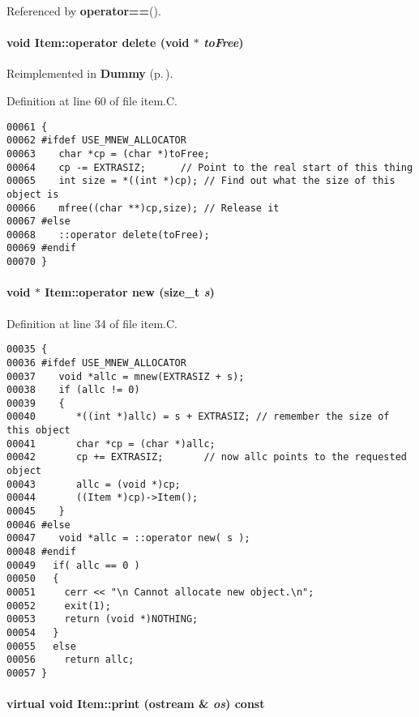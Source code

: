 Referenced by {\bf operator==}().\label{Item_a7}
\paragraph{\setlength{\rightskip}{0pt plus 5cm}void Item::operator delete (void $\ast$ {\em to\-Free})}\hfill



Reimplemented in {\bf Dummy} {\rm (p.\,\pageref{Dummy_a6})}.

Definition at line 60 of file item.C.\small\begin{verbatim}00061 {
00062 #ifdef USE_MNEW_ALLOCATOR
00063    char *cp = (char *)toFree;
00064    cp -= EXTRASIZ;      // Point to the real start of this thing
00065    int size = *((int *)cp); // Find out what the size of this object is
00066    mfree((char **)cp,size); // Release it
00067 #else
00068    ::operator delete(toFree);
00069 #endif
00070 }
\end{verbatim}\normalsize 
\label{Item_a6}
\paragraph{\setlength{\rightskip}{0pt plus 5cm}void $\ast$ Item::operator new (size\_\-t {\em s})}\hfill



Definition at line 34 of file item.C.\small\begin{verbatim}00035 {
00036 #ifdef USE_MNEW_ALLOCATOR
00037    void *allc = mnew(EXTRASIZ + s);
00038    if (allc != 0)
00039    {
00040       *((int *)allc) = s + EXTRASIZ; // remember the size of this object
00041       char *cp = (char *)allc;
00042       cp += EXTRASIZ;       // now allc points to the requested object
00043       allc = (void *)cp;
00044       ((Item *)cp)->Item();
00045    }
00046 #else
00047    void *allc = ::operator new( s );
00048 #endif
00049   if( allc == 0 )
00050   {
00051     cerr << "\n Cannot allocate new object.\n";
00052     exit(1);    
00053     return (void *)NOTHING;
00054   }
00055   else
00056     return allc;
00057 }
\end{verbatim}\normalsize 
\label{Item_a8}
\paragraph{\setlength{\rightskip}{0pt plus 5cm}virtual void Item::print (ostream \& {\em os}) const\hspace{0.3cm}{\tt  [pure virtual]}}\hfill



